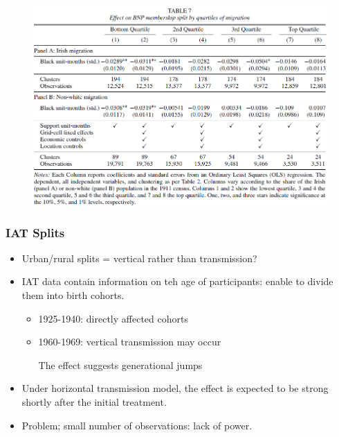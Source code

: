 \documentclass[dvipdfmx,11pt]{beamer}
\begin{document}
\begin{frame}\frametitle{}
  \begin{figure}
    \centering
    \includegraphics[scale = .6]{os1027tanji/T7}
  \end{figure}
\end{frame}

\begin{frame}\frametitle{IAT Splits}
  \begin{itemize}
    \item Urban/rural splits = vertical rather than transmission?
    \item IAT data contain information on teh age of participants: enable to divide them into birth cohorts.
    \begin{itemize}
      \item 1925-1940: directly affected cohorts
      \item 1960-1969: vertical transmission may occur

      The effect suggests generational jumps
    \end{itemize}
    \item Under horizontal transmission model, the effect is expected to be strong shortly after the initial treatment.
    \item Problem; small number of observations: lack of power.
  \end{itemize}
\end{frame}
\end{document}

